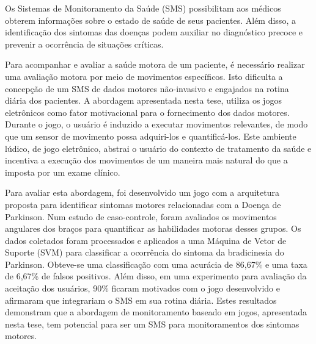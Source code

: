 Os Sistemas de Monitoramento da Saúde (SMS) possibilitam aos médicos obterem informações sobre o estado de saúde de seus pacientes. Além disso, a identificação dos sintomas das doenças podem auxiliar no diagnóstico precoce e prevenir a ocorrência de situações críticas.

Para acompanhar e avaliar a saúde motora de um paciente, é necessário realizar uma avaliação motora por meio de movimentos específicos. Isto dificulta a concepção de um SMS de dados motores não-invasivo e engajados na rotina diária dos pacientes. A abordagem apresentada nesta tese, utiliza os jogos eletrônicos como fator motivacional para o fornecimento dos dados motores. Durante o jogo, o usuário é induzido a executar movimentos relevantes, de modo que um sensor de movimento possa adquiri-los e quantificá-los. Este ambiente lúdico, de jogo eletrônico, abstrai o usuário do contexto de tratamento da saúde e incentiva a execução dos movimentos de um maneira mais natural do que a imposta por um exame clínico.

Para avaliar esta abordagem, foi desenvolvido um jogo com a arquitetura proposta para identificar sintomas motores relacionadas com a Doença de Parkinson. Num estudo de caso-controle, foram avaliados 
os movimentos angulares dos braços ​​para quantificar as habilidades motoras desses grupos. Os dados coletados foram processados ​​e aplicados a uma Máquina de Vetor de Suporte (SVM) para classificar a ocorrência do sintoma da bradicinesia do Parkinson. Obteve-se uma classificação com uma acurácia de 86,67\% e uma taxa de 6,67\% de falsos positivos. Além disso, em uma experimento para avaliação da aceitação dos usuários, 90\% ficaram motivados com o jogo desenvolvido e afirmaram que integrariam o SMS em sua rotina diária. Estes resultados demonstram que a abordagem de monitoramento baseado em jogos, apresentada nesta tese, tem potencial para ser um SMS para monitoramentos dos sintomas motores.







